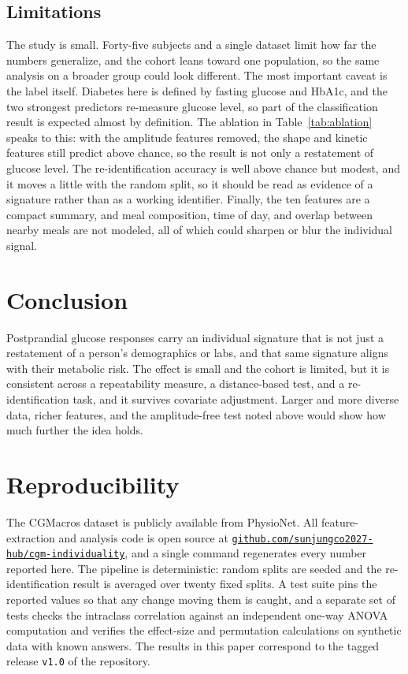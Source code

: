 \documentclass[10pt,conference,compsoc]{IEEEtran}
\begin{document}
\subsection{Limitations}
The study is small. Forty-five subjects and a single dataset limit how far the
numbers generalize, and the cohort leans toward one population, so the same
analysis on a broader group could look different. The most important caveat is the
label itself. Diabetes here is defined by fasting glucose and HbA1c, and the two
strongest predictors re-measure glucose level, so part of the classification
result is expected almost by definition. The ablation in Table~\ref{tab:ablation}
speaks to this: with the amplitude features removed, the shape and kinetic
features still predict above chance, so the result is not only a restatement of
glucose level. The re-identification accuracy is well above chance but
modest, and it moves a little with the random split, so it should be read as
evidence of a signature rather than as a working identifier. Finally, the ten
features are a compact summary, and meal composition, time of day, and overlap
between nearby meals are not modeled, all of which could sharpen or blur the
individual signal.

\section{Conclusion}

Postprandial glucose responses carry an individual signature that is not just a
restatement of a person's demographics or labs, and that same signature aligns
with their metabolic risk. The effect is small and the cohort is limited, but it
is consistent across a repeatability measure, a distance-based test, and a
re-identification task, and it survives covariate adjustment. Larger and more
diverse data, richer features, and the amplitude-free test noted above would show
how much further the idea holds.

\section*{Reproducibility}
The CGMacros dataset is publicly available from PhysioNet. All feature-extraction
and analysis code is open source at
\href{https://github.com/sunjungco2027-hub/cgm-individuality}{\nolinkurl{github.com/sunjungco2027-hub/cgm-individuality}}, and a single command
regenerates every number reported here. The pipeline is deterministic: random
splits are seeded and the re-identification result is averaged over twenty fixed
splits. A test suite pins the reported values so that any change moving them is
caught, and a separate set of tests checks the intraclass correlation against an
independent one-way ANOVA computation and verifies the effect-size and
permutation calculations on synthetic data with known answers. The results in
this paper correspond to the tagged release \texttt{v1.0} of the repository.
\end{document}
